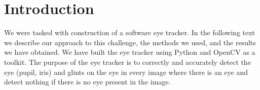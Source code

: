 \section{Introduction}

We were tasked with construction of a software eye tracker. In the following text we describe our approach to this challenge, the methods we used, and the results we have obtained.  We have built the eye tracker using Python and OpenCV as a toolkit. The purpose of the eye tracker is to correctly and accurately detect the eye (pupil, iris) and glints on the eye in every image where there is an eye and detect nothing if there is no eye present in the image.


